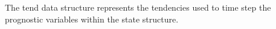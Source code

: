 The tend data structure represents the tendencies used to time step the
prognostic variables within the state structure. 
